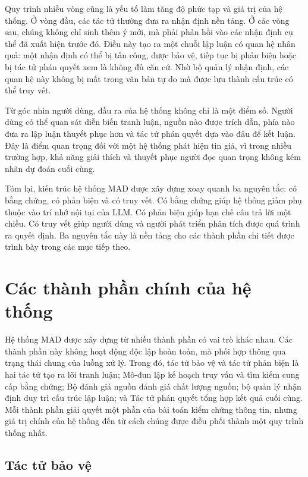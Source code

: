 ﻿\documentclass[oneside,a4paper,12pt]{extreport}
\begin{document}
Quy trình nhiều vòng cũng là yếu tố làm tăng độ phức tạp và giá trị của hệ thống. Ở vòng đầu, các tác tử thường đưa ra nhận định nền tảng. Ở các vòng sau, chúng không chỉ sinh thêm ý mới, mà phải phản hồi vào các nhận định cụ thể đã xuất hiện trước đó. Điều này tạo ra một chuỗi lập luận có quan hệ nhân quả: một nhận định có thể bị tấn công, được bảo vệ, tiếp tục bị phản biện hoặc bị tác tử phán quyết xem là không đủ căn cứ. Nhờ bộ quản lý nhận định, các quan hệ này không bị mất trong văn bản tự do mà được lưu thành cấu trúc có thể truy vết.

Từ góc nhìn người dùng, đầu ra của hệ thống không chỉ là một điểm số. Người dùng có thể quan sát diễn biến tranh luận, nguồn nào được trích dẫn, phía nào đưa ra lập luận thuyết phục hơn và tác tử phán quyết dựa vào đâu để kết luận. Đây là điểm quan trọng đối với một hệ thống phát hiện tin giả, vì trong nhiều trường hợp, khả năng giải thích và thuyết phục người đọc quan trọng không kém nhãn dự đoán cuối cùng.

Tóm lại, kiến trúc hệ thống MAD được xây dựng xoay quanh ba nguyên tắc: có bằng chứng, có phản biện và có truy vết. Có bằng chứng giúp hệ thống giảm phụ thuộc vào trí nhớ nội tại của LLM. Có phản biện giúp hạn chế câu trả lời một chiều. Có truy vết giúp người dùng và người phát triển phân tích được quá trình ra quyết định. Ba nguyên tắc này là nền tảng cho các thành phần chi tiết được trình bày trong các mục tiếp theo.
\section{Các thành phần chính của hệ thống}

Hệ thống MAD được xây dựng từ nhiều thành phần có vai trò khác nhau. Các thành phần này không hoạt động độc lập hoàn toàn, mà phối hợp thông qua trạng thái chung của luồng xử lý. Trong đó, tác tử bảo vệ và tác tử phản biện là hai tác tử tạo ra lõi tranh luận; Mô-đun lập kế hoạch truy vấn và tìm kiếm cung cấp bằng chứng; Bộ đánh giá nguồn đánh giá chất lượng nguồn; bộ quản lý nhận định duy trì cấu trúc lập luận; và Tác tử phán quyết tổng hợp kết quả cuối cùng. Mỗi thành phần giải quyết một phần của bài toán kiểm chứng thông tin, nhưng giá trị chính của hệ thống đến từ cách chúng được điều phối thành một quy trình thống nhất.

\subsection{Tác tử bảo vệ}
\end{document}
